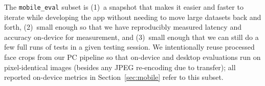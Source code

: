 The \texttt{mobile\_eval} subset is (1)~a snapshot that makes it easier and faster to iterate while developing the app without needing to move large datasets back and forth, (2)~small enough so that we have reproducibly measured latency and accuracy on\hyp device for measurement, and (3)~small enough that we can still do a few full runs of tests in a given testing session. We intentionally reuse processed face crops from our PC pipeline so that on\hyp device and desktop evaluations run on pixel\hyp identical images (besides any JPEG re\hyp encoding due to transfer); all reported on\hyp device metrics in Section~\ref{sec:mobile} refer to this subset.
